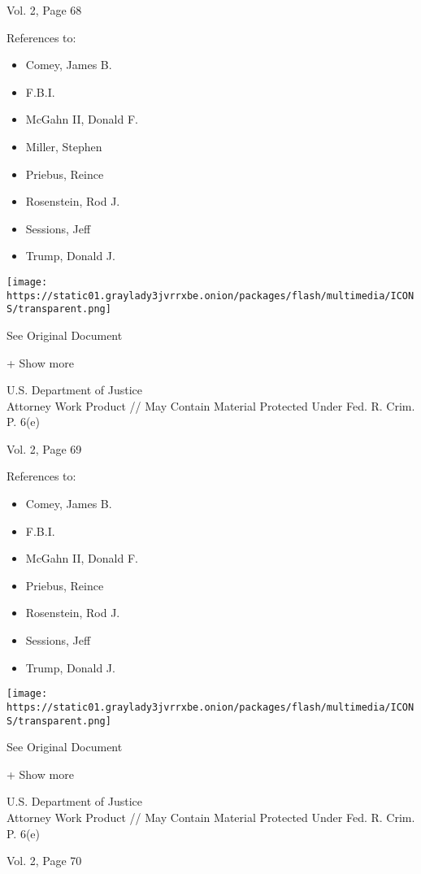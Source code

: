 Vol. 2, Page 68

References to:

\begin{itemize}
\tightlist
\item
  Comey, James B.
\item
  F.B.I.
\item
  McGahn II, Donald F.
\item
  Miller, Stephen
\item
  Priebus, Reince
\item
  Rosenstein, Rod J.
\item
  Sessions, Jeff
\item
  Trump, Donald J.
\end{itemize}

\protect\hyperlink{}{}

\texttt{[image: https://static01.graylady3jvrrxbe.onion/packages/flash/multimedia/ICONS/transparent.png]}

See Original Document

+ Show more

U.S. Department of Justice\\
Attorney Work Product // May Contain Material Protected Under Fed. R.
Crim. P. 6(e)

Vol. 2, Page 69

References to:

\begin{itemize}
\tightlist
\item
  Comey, James B.
\item
  F.B.I.
\item
  McGahn II, Donald F.
\item
  Priebus, Reince
\item
  Rosenstein, Rod J.
\item
  Sessions, Jeff
\item
  Trump, Donald J.
\end{itemize}

\protect\hyperlink{}{}

\texttt{[image: https://static01.graylady3jvrrxbe.onion/packages/flash/multimedia/ICONS/transparent.png]}

See Original Document

+ Show more

U.S. Department of Justice\\
Attorney Work Product // May Contain Material Protected Under Fed. R.
Crim. P. 6(e)

Vol. 2, Page 70

